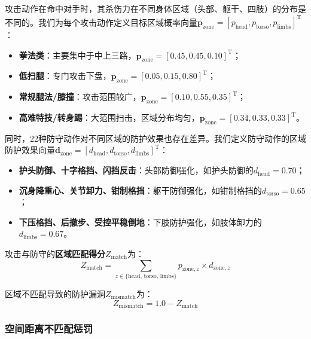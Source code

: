 \documentclass[a4paper,12pt]{article}
\numberwithin{equation}{section}
\numberwithin{table}{section}
\numberwithin{figure}{section}
\begin{document}
攻击动作在命中对手时，其杀伤力在不同身体区域（头部、躯干、四肢）的分布是不同的。我们为每个攻击动作定义目标区域概率向量$\boldsymbol{p}_{\text{zone}} = [p_{\text{head}}, p_{\text{torso}}, p_{\text{limbs}}]^{\mathrm{T}}$：
\begin{itemize}
    \item \textbf{拳法类}：主要集中于中上三路，$\boldsymbol{p}_{\text{zone}} = [0.45, 0.45, 0.10]^{\mathrm{T}}$；
    \item \textbf{低扫腿}：专门攻击下盘，$\boldsymbol{p}_{\text{zone}} = [0.05, 0.15, 0.80]^{\mathrm{T}}$；
    \item \textbf{常规腿法/膝撞}：攻击范围较广，$\boldsymbol{p}_{\text{zone}} = [0.10, 0.55, 0.35]^{\mathrm{T}}$；
    \item \textbf{高难特技/转身踢}：大范围扫击，区域分布均匀，$\boldsymbol{p}_{\text{zone}} = [0.34, 0.33, 0.33]^{\mathrm{T}}$。
\end{itemize}

同时，22种防守动作对不同区域的防护效果也存在差异。我们定义防守动作的区域防护效果向量$\boldsymbol{d}_{\text{zone}} = [d_{\text{head}}, d_{\text{torso}}, d_{\text{limbs}}]^{\mathrm{T}}$：
\begin{itemize}
    \item \textbf{护头防御、十字格挡、闪挡反击}：头部防御强化，如护头防御的$d_{\text{head}} = 0.70$；
    \item \textbf{沉身降重心、关节卸力、钳制格挡}：躯干防御强化，如钳制格挡的$d_{\text{torso}} = 0.65$；
    \item \textbf{下压格挡、后撤步、受控平稳倒地}：下肢防护强化，如肢体卸力的$d_{\text{limbs}} = 0.67$。
\end{itemize}

攻击与防守的\textbf{区域匹配得分}$Z_{\text{match}}$为：
\begin{equation}
    Z_{\text{match}} = \sum_{z \in \{\text{head, torso, limbs}\}} p_{\text{zone}, z} \times d_{\text{zone}, z}
    \label{eq:zmatch}
\end{equation}

区域不匹配导致的防护漏洞$Z_{\text{mismatch}}$为：
\begin{equation}
    Z_{\text{mismatch}} = 1.0 - Z_{\text{match}}
    \label{eq:zmismatch}
\end{equation}

\subsubsection{空间距离不匹配惩罚}
\end{document}
